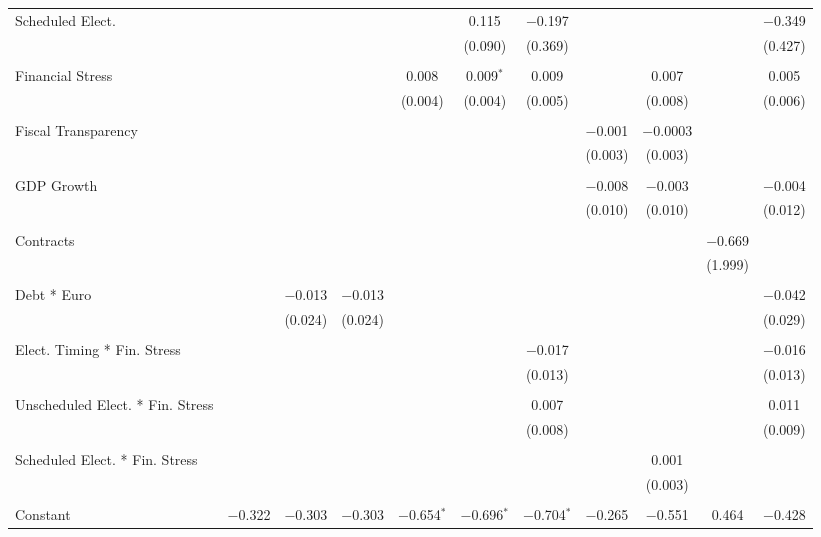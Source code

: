 \begin{table}[!htbp]
\begin{tabular}{@{\extracolsep{5pt}}lcccccccccc}
 Scheduled Elect. &  &  &  &  & 0.115 & $-$0.197 &  &  &  & $-$0.349 \\ 
  &  &  &  &  & (0.090) & (0.369) &  &  &  & (0.427) \\ 
  & & & & & & & & & & \\ 
 Financial Stress &  &  &  & 0.008 & 0.009$^{*}$ & 0.009 &  & 0.007 &  & 0.005 \\ 
  &  &  &  & (0.004) & (0.004) & (0.005) &  & (0.008) &  & (0.006) \\ 
  & & & & & & & & & & \\ 
 Fiscal Transparency &  &  &  &  &  &  & $-$0.001 & $-$0.0003 &  &  \\ 
  &  &  &  &  &  &  & (0.003) & (0.003) &  &  \\ 
  & & & & & & & & & & \\ 
 GDP Growth &  &  &  &  &  &  & $-$0.008 & $-$0.003 &  & $-$0.004 \\ 
  &  &  &  &  &  &  & (0.010) & (0.010) &  & (0.012) \\ 
  & & & & & & & & & & \\ 
 Contracts &  &  &  &  &  &  &  &  & $-$0.669 &  \\ 
  &  &  &  &  &  &  &  &  & (1.999) &  \\ 
  & & & & & & & & & & \\ 
 Debt * Euro &  & $-$0.013 & $-$0.013 &  &  &  &  &  &  & $-$0.042 \\ 
  &  & (0.024) & (0.024) &  &  &  &  &  &  & (0.029) \\ 
  & & & & & & & & & & \\ 
 Elect. Timing * Fin. Stress &  &  &  &  &  & $-$0.017 &  &  &  & $-$0.016 \\ 
  &  &  &  &  &  & (0.013) &  &  &  & (0.013) \\ 
  & & & & & & & & & & \\ 
 Unscheduled Elect. * Fin. Stress &  &  &  &  &  & 0.007 &  &  &  & 0.011 \\ 
  &  &  &  &  &  & (0.008) &  &  &  & (0.009) \\ 
  & & & & & & & & & & \\ 
 Scheduled Elect. * Fin. Stress &  &  &  &  &  &  &  & 0.001 &  &  \\ 
  &  &  &  &  &  &  &  & (0.003) &  &  \\ 
  & & & & & & & & & & \\ 
 Constant & $-$0.322 & $-$0.303 & $-$0.303 & $-$0.654$^{*}$ & $-$0.696$^{*}$ & $-$0.704$^{*}$ & $-$0.265 & $-$0.551 & 0.464 & $-$0.428 \\ 

\end{tabular}
\end{table}
